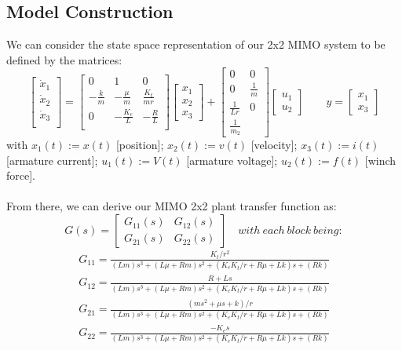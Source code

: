 \documentclass[a4paper, 12pt]{article}
\begin{document}
\subsection{Model Construction}
We can consider the state space representation of our 2x2 MIMO system to be defined by the matrices:
\begin{equation}
    \begin{bmatrix}
    \dot{x}_1 \\
    \dot{x}_2 \\
    \dot{x}_3 \\
    \end{bmatrix} =
    \begin{bmatrix}
    0 & 1 & 0 \\
    -\frac{k}{m} & -\frac{\mu}{m} & \frac{K_t}{mr} \\
    0 & -\frac{K_e}{L} & -\frac{R}{L}\\
    \end{bmatrix}
    \begin{bmatrix}
    x_1 \\
    x_2 \\
    x_3
    \end{bmatrix} +
    \begin{bmatrix}
    0 & 0\\
    0 & \frac{1}{m}\\
    \frac{1}{Lr} & 0\\
    \frac{1}{m_2}
    \end{bmatrix}
    \begin{bmatrix}
    u_1 \\ u_2  
    \end{bmatrix} 
    \quad \quad
    y = 
    \begin{bmatrix}
    x_1 \\ x_3  
    \end{bmatrix}
\end{equation}
with $x_1(t) := x(t)$ [position]; \quad $x_2(t) := v(t)$ [velocity]; \quad $x_3(t) := i(t)$ [armature current]; \quad $u_1(t) := V(t)$ [armature voltage]; \quad $u_2(t) := f(t)$ [winch force].
\\\\
From there, we can derive our MIMO 2x2 plant transfer function as:
\begin{equation}
        G(s) = 
    \begin{bmatrix}
        G_{11}(s) & G_{12}(s) \\ 
        G_{21}(s) & G_{22}(s)
    \end{bmatrix}\quad with\ each\ block\ being:
\end{equation}
\begin{align*}
    G_{11} = \frac{K_t/r^2}{(L m)s^3 + (L \mu + R m)s^2 + (K_e K_t / r + R \mu + L k)s + (R k )} \\
    G_{12} = \frac{R + Ls}{(L m)s^3 + (L \mu + R m)s^2 + (K_e K_t / r + R \mu + L k)s + (R k )} \\
    G_{21} = \frac{(ms^2 + \mu s + k)/r}{(L m)s^3 + (L \mu + R m)s^2 + (K_e K_t / r + R \mu + L k)s + (R k )} \\
    G_{22} = \frac{-K_e s}{(L m)s^3 + (L \mu + R m)s^2 + (K_e K_t / r + R \mu + L k)s + (R k )} \\
\end{align*}
\end{document}
